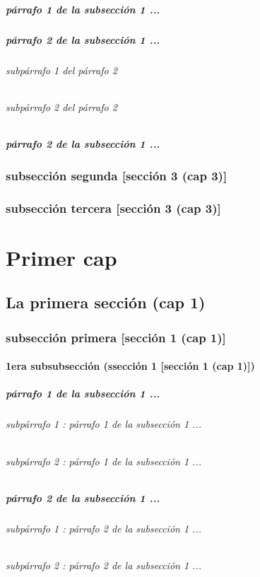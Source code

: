 \documentclass[12pt,a4paper]{report}
\begin{document}
\paragraph*{párrafo 1 de la subsección 1 ...}
\paragraph*{párrafo 2 de la subsección 1 ...}
\subparagraph*{subpárrafo 1 del párrafo 2}
\subparagraph*{subpárrafo 2 del párrafo 2}
\paragraph*{párrafo 2 de la subsección 1 ...}
\subsection*{subsección segunda [sección 3 (cap 3)]}
\subsection*{subsección tercera [sección 3 (cap 3)]}



\appendix
\chapter{Primer cap}
\section{La primera sección (cap 1)}
\subsection{subsección primera [sección 1 (cap 1)]}
\subsubsection{1era subsubsección (ssección 1 [sección 1 (cap 1)])}
\paragraph{párrafo 1 de la subsección 1 ...}
\subparagraph{subpárrafo 1 : párrafo 1 de la subsección 1 ...}
\subparagraph{subpárrafo 2 : párrafo 1 de la subsección 1 ...}
\paragraph{párrafo 2 de la subsección 1 ...}
\subparagraph{subpárrafo 1 : párrafo 2 de la subsección 1 ...}
\subparagraph{subpárrafo 2 : párrafo 2 de la subsección 1 ...}
\end{document}
